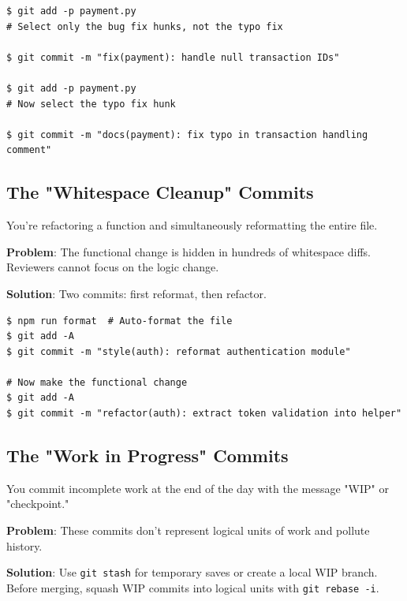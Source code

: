 \begin{lstlisting}[style=shell,caption={Staging changes selectively}]
$ git add -p payment.py
# Select only the bug fix hunks, not the typo fix

$ git commit -m "fix(payment): handle null transaction IDs"

$ git add -p payment.py
# Now select the typo fix hunk

$ git commit -m "docs(payment): fix typo in transaction handling comment"
\end{lstlisting}

\subsection{The "Whitespace Cleanup" Commits}
You're refactoring a function and simultaneously reformatting the entire file.

\begin{warningbox}
\textbf{Problem}: The functional change is hidden in hundreds of whitespace diffs. Reviewers cannot focus on the logic change.

\textbf{Solution}: Two commits: first reformat, then refactor.
\end{warningbox}

\begin{lstlisting}[style=shell,caption={Separating formatting from logic changes}]
$ npm run format  # Auto-format the file
$ git add -A
$ git commit -m "style(auth): reformat authentication module"

# Now make the functional change
$ git add -A
$ git commit -m "refactor(auth): extract token validation into helper"
\end{lstlisting}

\subsection{The "Work in Progress" Commits}
You commit incomplete work at the end of the day with the message "WIP" or "checkpoint."

\begin{warningbox}
\textbf{Problem}: These commits don't represent logical units of work and pollute history.

\textbf{Solution}: Use \texttt{git stash} for temporary saves or create a local WIP branch. Before merging, squash WIP commits into logical units with \texttt{git rebase -i}.
\end{warningbox}

